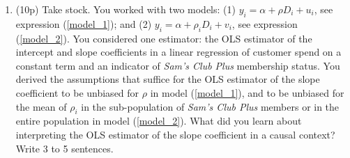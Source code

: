 \documentclass{article}
\begin{document}
\begin{enumerate}[label=\textbf{Q\arabic{enumi}}.,ref=Q\arabic{enumi}, wide=0pt, itemsep=1em, topsep=5pt]
    \item (10p) Take stock. You worked with two models: (1) $y_{i}=\alpha +\rho D_{i}+u _{i}$, see expression (\ref{model_1}); and (2) $y_{i}=\alpha +\rho _{i}D_{i}+v_{i}$, see expression (\ref{model_2}). You considered one estimator: the OLS estimator of the intercept and slope coefficients in a linear regression of customer spend on a constant term and an indicator of \textit{Sam's Club Plus} membership status. You derived the assumptions that suffice for the OLS estimator of the slope coefficient to be unbiased for $\rho$ in model (\ref{model_1}), and to be unbiased for the mean of $\rho _{i}$ in the sub-population of \textit{Sam's Club Plus}  members or in the entire population in model (\ref{model_2}). What did you learn about interpreting the OLS estimator of the slope coefficient in a causal context? Write 3 to 5 sentences.
\end{enumerate}
\end{document}
